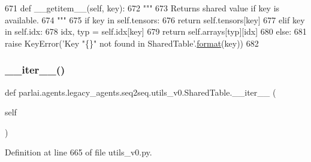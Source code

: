 \begin{DoxyCode}
671     \textcolor{keyword}{def }\_\_getitem\_\_(self, key):
672         \textcolor{stringliteral}{"""}
673 \textcolor{stringliteral}{        Returns shared value if key is available.}
674 \textcolor{stringliteral}{        """}
675         \textcolor{keywordflow}{if} key \textcolor{keywordflow}{in} self.tensors:
676             \textcolor{keywordflow}{return} self.tensors[key]
677         \textcolor{keywordflow}{elif} key \textcolor{keywordflow}{in} self.idx:
678             idx, typ = self.idx[key]
679             \textcolor{keywordflow}{return} self.arrays[typ][idx]
680         \textcolor{keywordflow}{else}:
681             \textcolor{keywordflow}{raise} KeyError(\textcolor{stringliteral}{'Key "\{\}" not found in SharedTable'}.\hyperlink{namespaceparlai_1_1chat__service_1_1services_1_1messenger_1_1shared__utils_a32e2e2022b824fbaf80c747160b52a76}{format}(key))
682 
\end{DoxyCode}
\mbox{\label{classparlai_1_1agents_1_1legacy__agents_1_1seq2seq_1_1utils__v0_1_1SharedTable_a8856d56b13e4d45bc4b6c0097a2579e1}} 
\subsubsection{\texorpdfstring{\+\_\+\+\_\+iter\+\_\+\+\_\+()}{\_\_iter\_\_()}}
{\footnotesize\ttfamily def parlai.\+agents.\+legacy\+\_\+agents.\+seq2seq.\+utils\+\_\+v0.\+Shared\+Table.\+\_\+\+\_\+iter\+\_\+\+\_\+ (\begin{DoxyParamCaption}\item[{}]{self }\end{DoxyParamCaption})}



Definition at line 665 of file utils\+\_\+v0.\+py.


